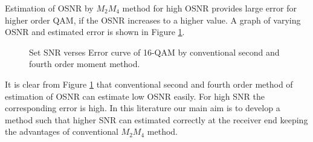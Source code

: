 \documentclass[12pt]{report}
\begin{document}
Estimation of OSNR by $M_2 M_4$ method for high OSNR provides large error for higher order QAM, if the OSNR increases to a higher value. A graph of varying OSNR and estimated error is shown in Figure \ref{fig:standardm2m4error}.
\begin{figure}[htbp]
	\caption{Set SNR verses Error curve of 16-QAM by conventional second and fourth order moment method.}
	\label{fig:standardm2m4error}
\end{figure}

It is clear from Figure \ref{fig:standardm2m4error} that conventional second and fourth order method of estimation of OSNR can estimate low OSNR easily. For high SNR the corresponding error is high. In this literature our main aim is to develop a method such that higher SNR can estimated correctly at the receiver end keeping the advantages of conventional $M_2 M_4$ method.
\end{document}
